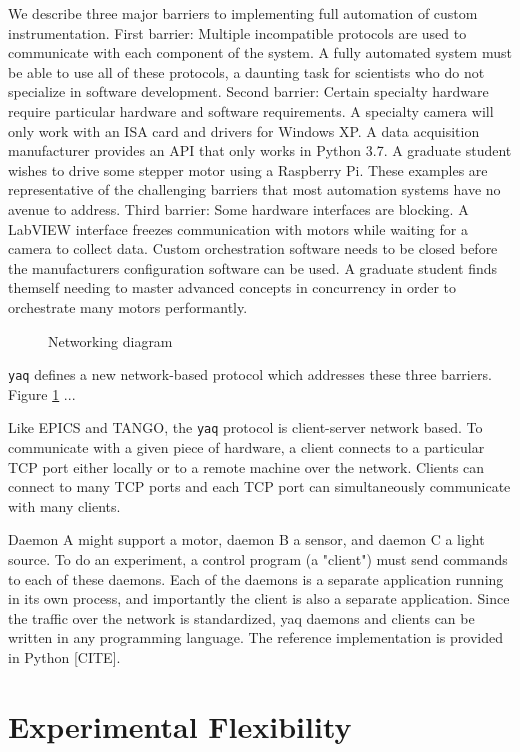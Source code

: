 \documentclass[aip, amsmath, amssymb, reprint,]{revtex4-1}
\newcommand\yaq{\texttt{yaq}}
\begin{document}
We describe three major barriers to implementing full automation of custom instrumentation.
First barrier: Multiple incompatible protocols are used to communicate with each component of the system.
A fully automated system must be able to use all of these protocols, a daunting task for scientists who do not specialize in software development\cite{}.
Second barrier: Certain specialty hardware require particular hardware and software requirements.
A specialty camera will only work with an ISA card and drivers for Windows XP.
A data acquisition manufacturer provides an API that only works in Python 3.7.
A graduate student wishes to drive some stepper motor using a Raspberry Pi.
These examples are representative of the challenging barriers that most automation systems have no avenue to address.
Third barrier: Some hardware interfaces are blocking.
A LabVIEW interface freezes communication with motors while waiting for a camera to collect data.
Custom orchestration software needs to be closed before the manufacturers configuration software can be used.
A graduate student finds themself needing to master advanced concepts in concurrency in order to orchestrate many motors performantly.

\begin{figure}
\caption{\label{fig:network} Networking diagram}
\end{figure}

\yaq{} defines a new network-based protocol which addresses these three barriers.
Figure \ref{fig:network} ...

Like EPICS and TANGO, the \yaq{} protocol is client-server network based.
To communicate with a given piece of hardware, a client connects to a particular TCP port either locally or to a remote machine over the network.
Clients can connect to many TCP ports and each TCP port can simultaneously communicate with many clients.

Daemon A might support a motor, daemon B a sensor, and daemon C a light source.
To do an experiment, a control program (a "client") must send commands to each of these daemons.
Each of the daemons is a separate application running in its own process, and importantly the client is also a separate application.
Since the traffic over the network is standardized, yaq daemons and clients can be written in any programming language.
The reference implementation is provided in Python [CITE].

\section{Experimental Flexibility}
\end{document}
